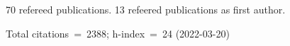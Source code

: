 70 refereed publications. 13 refeered publications as first author.

Total citations~=~2388; h-index~=~24 (2022-03-20)